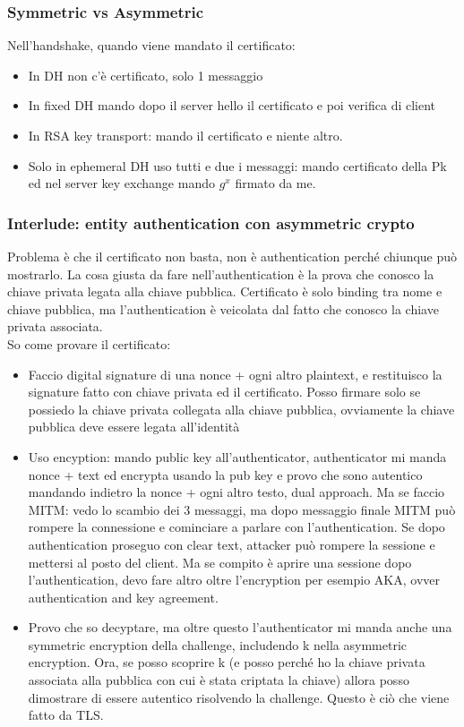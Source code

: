 \documentclass[16px]{article}
\begin{document}
\subsubsection{Symmetric vs Asymmetric}
Nell'handshake, quando viene mandato il certificato:
\begin{itemize}
\item In DH non c'è certificato, solo 1 messaggio
\item In fixed DH mando dopo il server hello il certificato e poi verifica di client
\item In RSA key transport: mando il certificato e niente altro.
\item Solo in ephemeral DH uso tutti e due i messaggi: mando certificato della Pk ed nel server key exchange mando $g^x$ firmato da me.
\end{itemize}
\subsubsection{Interlude: entity authentication con asymmetric crypto}
Problema è che il certificato non basta, non è authentication perché chiunque può mostrarlo. La cosa giusta da fare nell'authentication è la prova che conosco la chiave privata legata alla chiave pubblica. Certificato è solo binding tra nome e chiave pubblica, ma l'authentication è veicolata dal fatto che conosco la chiave privata associata.\\ So come provare il certificato: 
\begin{itemize}
\item Faccio digital signature di una nonce + ogni altro plaintext, e restituisco la signature fatto con chiave privata ed il certificato. Posso firmare solo se possiedo la chiave privata collegata alla chiave pubblica, ovviamente la chiave pubblica deve essere legata all'identità
\item Uso encyption: mando public key all'authenticator,  authenticator mi manda nonce + text ed encrypta usando la pub key e provo che sono autentico mandando indietro la nonce + ogni altro testo, dual approach. Ma se faccio MITM: vedo lo scambio dei 3 messaggi, ma dopo messaggio finale MITM può rompere la connessione e cominciare a parlare con  l'authentication. Se dopo authentication proseguo con clear text, attacker può rompere la sessione e mettersi al posto del client. Ma se compito è aprire una sessione dopo l'authentication, devo fare altro oltre l'encryption per esempio AKA, ovver authentication and key agreement.
\item Provo che so decyptare, ma oltre questo l'authenticator mi manda anche una symmetric encryption della challenge, includendo k nella asymmetric encryption. Ora, se posso scoprire k (e posso perché ho la chiave privata associata alla pubblica con cui è stata criptata la chiave) allora posso dimostrare di essere autentico risolvendo la challenge. Questo è ciò che viene fatto da TLS.
\end{itemize}
\end{document}
